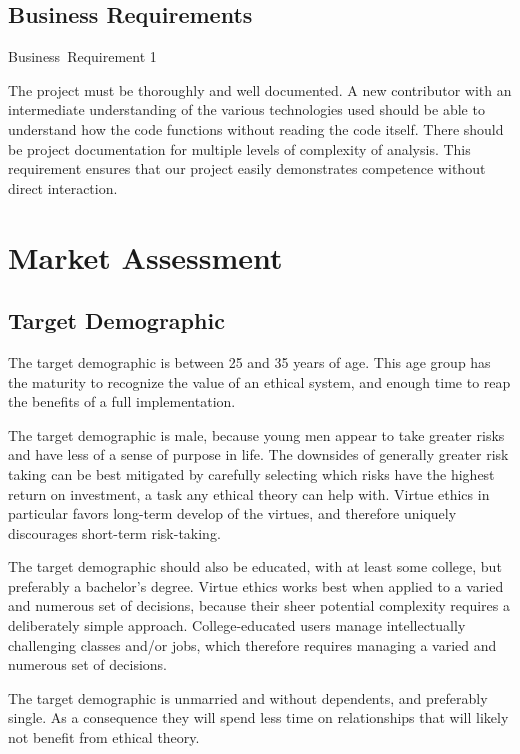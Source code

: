 \documentclass{article}
\newcommand{\requirementname}{Undefined}
\newcommand{\requirementlabel}{undefined}
\newcommand{\setreqtype}[2]
    {
        \renewcommand{\requirementname}{#1}
        \renewcommand{\requirementlabel}{#2}
    }
\newenvironment{requirement}[2][]
    {
        \begin{mdframed}
        \label{\requirementlabel-#2}
        \vspace{2.5mm}
        \begin{center}
            {
                \large
                \requirementname\ Requirement #2
            
                #1
            }
        \end{center}
        \vspace{2.5mm}
    }
    {
        \end{mdframed}
    }
\begin{document}
\subsection{Business Requirements}
\setreqtype{Business}{business}

\begin{requirement}{1}
    The project must be thoroughly and well documented.
    A new contributor with an intermediate understanding of the various technologies used should be able to understand how the code functions without reading the code itself.
    There should be project documentation for multiple levels of complexity of analysis.
    This requirement ensures that our project easily demonstrates competence without direct interaction.
\end{requirement}

\section{Market Assessment}

\subsection{Target Demographic}

The target demographic is between 25 and 35 years of age.
This age group has the maturity to recognize the value of an ethical system, and enough time to reap the benefits of a full implementation.

The target demographic is male, because young men appear to take greater risks and have less of a sense of purpose in life.
The downsides of generally greater risk taking can be best mitigated by carefully selecting which risks have the highest return on investment, a task any ethical theory can help with.
Virtue ethics in particular favors long-term develop of the virtues, and therefore uniquely discourages short-term risk-taking.

The target demographic should also be educated, with at least some college, but preferably a bachelor's degree.
Virtue ethics works best when applied to a varied and numerous set of decisions, because their sheer potential complexity requires a deliberately simple approach.
College-educated users manage intellectually challenging classes and/or jobs, which therefore requires managing a varied and numerous set of decisions.

The target demographic is unmarried and without dependents, and preferably single.
As a consequence they will spend less time on relationships that will likely not benefit from ethical theory.
\end{document}
